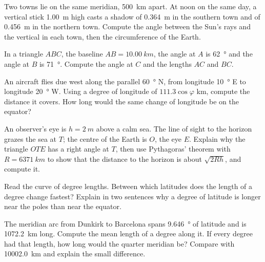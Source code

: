 \begin{exercise}[$\star\star$]\label{exo:g10:measuring-the-earth:6}
Two towns lie on the same meridian, \qty{500}{km} apart. At noon on the same
day, a vertical stick \qty{1.00}{m} high casts a shadow of \qty{0.364}{m} in
the southern town and of \qty{0.456}{m} in the northern town. Compute the
angle between the Sun's rays and the vertical in each town, then the
circumference of the Earth.
\end{exercise}

\begin{exercise}[$\star\star$]\label{exo:g10:measuring-the-earth:7}
In a triangle $ABC$, the baseline $AB = \qty{10.00}{km}$, the angle at $A$ is
\qty{62}{\degree} and the angle at $B$ is \qty{71}{\degree}. Compute the
angle at $C$ and the lengths $AC$ and $BC$.
\end{exercise}

\begin{exercise}[$\star\star$]\label{exo:g10:measuring-the-earth:8}
An aircraft flies due west along the parallel \qty{60}{\degree} N, from
longitude \qty{10}{\degree} E to longitude \qty{20}{\degree} W. Using a degree
of longitude of $111.3 \cos \varphi$ km, compute the distance it covers.
How long would the same change of longitude be on the equator?
\end{exercise}

\begin{exercise}[$\star\star$]\label{exo:g10:measuring-the-earth:9}
An observer's eye is $h = \qty{2}{m}$ above a calm sea. The line of sight to
the horizon grazes the sea at $T$; the centre of the Earth is $O$, the eye
$E$. Explain why the triangle $OTE$ has a right angle at $T$, then use
Pythagoras' theorem with $R = \qty{6371}{km}$ to show that the distance to
the horizon is about $\sqrt{2Rh}$, and compute it.
\end{exercise}

\begin{exercise}[$\star\star$]\label{exo:g10:measuring-the-earth:10}
Read the curve of degree lengths. Between which latitudes does the length of
a degree change fastest? Explain in two sentences why a degree of latitude is
longer near the poles than near the equator.
\end{exercise}

\begin{exercise}[$\star\star$]\label{exo:g10:measuring-the-earth:11}
The meridian arc from Dunkirk to Barcelona spans \qty{9.646}{\degree} of
latitude and is \qty{1072.2}{km} long. Compute the mean length of a degree
along it. If every degree had that length, how long would the quarter
meridian be? Compare with \qty{10002.0}{km} and explain the small
difference.
\end{exercise}

